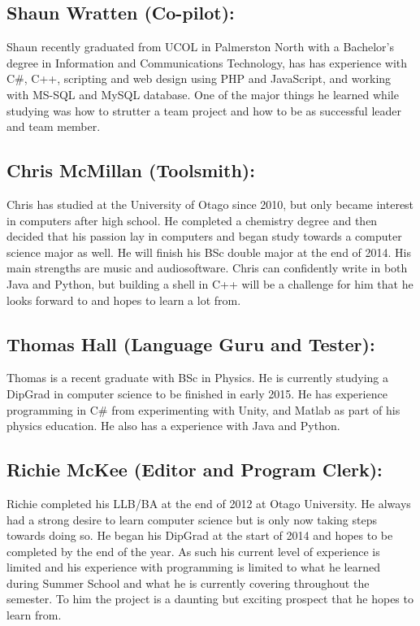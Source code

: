 \documentclass[a4paper,12pt]{article}
\begin{document}
\subsection*{Shaun Wratten (Co-pilot):}
Shaun recently graduated from UCOL in Palmerston North with a Bachelor’s degree in Information and Communications Technology,
has has experience with
C\#, C++, scripting and web design using PHP and JavaScript, and working with MS-SQL and MySQL database. One of the major things he learned while studying was how to
strutter a team project and how to be as successful leader and team member.

\subsection*{Chris McMillan (Toolsmith):}
Chris has studied at the University of Otago since 2010, but only became interest in computers after high school. He completed a chemistry degree and then decided that his passion lay in computers and began study towards a computer science major as well. He will finish his BSc double major at the end of 2014. His main strengths are music and audiosoftware. Chris can confidently write in both Java and Python, but building a shell in C++ will be a challenge for him that he looks forward to and hopes to learn a lot from.

\subsection*{Thomas Hall (Language Guru and Tester):}
Thomas is a recent graduate with BSc in Physics. He is currently studying a DipGrad in computer science to be finished in early 2015. He has experience programming in C\# from experimenting with Unity, and Matlab as part of his physics education. He also has a experience with Java and Python.

\subsection*{Richie McKee (Editor and Program Clerk):}
Richie completed his LLB/BA at the end of 2012 at Otago University. He always had a strong desire to learn computer science but is only now taking steps towards doing so. He began his DipGrad at the start of 2014 and hopes to be completed by the end of the year. As such his current level of experience is limited and his experience with programming is limited to what he learned during Summer School and what he is currently covering throughout the semester. To him the project is a daunting but exciting prospect that he hopes to learn from.
\end{document}
